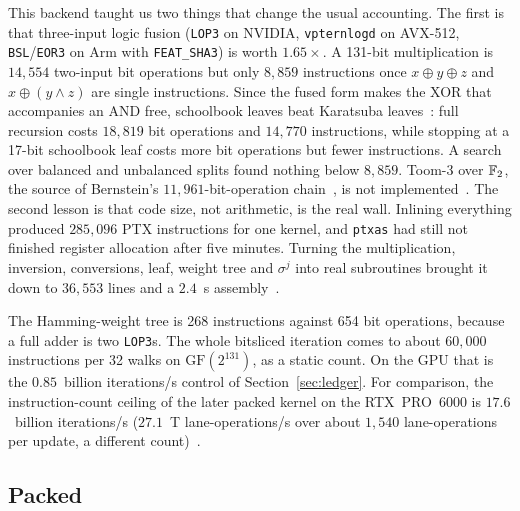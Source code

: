This backend taught us two things that change the usual accounting.
The first is that three-input logic fusion (\texttt{LOP3} on NVIDIA,
\texttt{vpternlogd} on AVX-512, \texttt{BSL}/\texttt{EOR3} on Arm with
\texttt{FEAT\_SHA3}) is worth $1.65\times$. A 131-bit multiplication is
$14{,}554$ two-input bit operations but only $8{,}859$ instructions
once $x\oplus y\oplus z$ and $x\oplus(y\wedge z)$ are single
instructions. Since the fused form makes the XOR that accompanies an
AND free, schoolbook leaves beat Karatsuba leaves~\cite{karatsuba1962}:
full recursion costs $18{,}819$ bit operations and $14{,}770$
instructions, while stopping at a 17-bit schoolbook leaf costs more
bit operations but fewer instructions. A search over balanced and
unbalanced splits found nothing below $8{,}859$. Toom-3 over $\mathbb{F}_2$,
the source of Bernstein's $11{,}961$-bit-operation
chain~\cite{bernstein2009batch}, is not
implemented~. The second
lesson is that code size, not arithmetic, is the real wall. Inlining
everything produced $285{,}096$ PTX instructions for one kernel, and
\texttt{ptxas} had still not finished register allocation after five
minutes. Turning the multiplication, inversion, conversions, leaf,
weight tree and $\sigma^j$ into real subroutines brought it down to
$36{,}553$ lines and a $2.4$~s assembly~.

The Hamming-weight tree is 268 instructions against 654 bit
operations, because a full adder is two \texttt{LOP3}s. The whole
bitsliced iteration comes to about $60{,}000$ instructions per 32
walks on $\mathrm{GF}(2^{131})$, as a static count. On the GPU that is
the $0.85$~billion iterations/s control of Section~\ref{sec:ledger}. For comparison,
the instruction-count ceiling of the later packed kernel on the
RTX~PRO~6000 is $17.6$~billion iterations/s ($27.1$~T lane-operations/s over about
$1{,}540$ lane-operations per update, a different
count)~.

\subsection{Packed}
\label{sec:arith-packed}

